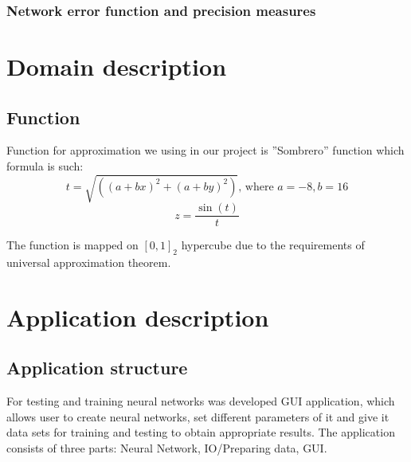 \documentclass[a4paper,12pt]{article}
\begin{document}
\subsubsection{Network error function and precision measures}


\section{Domain description}

\subsection{Function}
Function for approximation we using in our project is ''Sombrero'' function which formula is such:
\begin{equation}
 t = \sqrt{((a+bx)^2+(a+by)^2)} \text{, where } a = -8, b = 16
 \end{equation}
 \begin{equation}
 z = \frac
 {\sin(t)}
 {t}
\end{equation}

The function is mapped on $[0,1]_2$ hypercube due to the requirements of universal approximation theorem.





\section{Application description}

\subsection{Application structure}

For testing and training neural networks was developed GUI application, which allows user to create neural networks, set different parameters of it and give it data sets for training and  testing to obtain appropriate results. The application consists of three parts: Neural Network, IO/Preparing data, GUI. 
\end{document}
